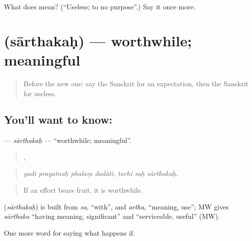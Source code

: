 \begin{tcolorbox}[breakable,colback=teal!4,colframe=teal!35!black,title={Before you move on}]
What does  mean? (\textquotedblleft{}Useless; to no purpose\textquotedblright{}.) Say it once more.
\end{tcolorbox}
\section[\texorpdfstring{\sk{सार्थकः} (sārthakaḥ)}{सार्थकः (sārthakaḥ)}]{ (sārthakaḥ) — worthwhile; meaningful}

\label{lesson:SA-C390-sarthakah}



\begin{quote}
Before the new one: say the Sanskrit for an expectation, then the Sanskrit for useless.
\end{quote}

\subsection*{You'll want to know: }
\textbf{} — \emph{sārthakaḥ} — \textquotedblleft{}worthwhile; meaningful\textquotedblright{}.

\begin{quote}
   ,   
\end{quote}

\begin{quote}
\emph{yadi prayatnaḥ phalaṃ dadāti, tarhi saḥ sārthakaḥ.}
\end{quote}

\begin{quote}
If an effort bears fruit, it is worthwhile.
\end{quote}

\begin{cousinweb}
\textbf{} (\emph{sārthakaḥ}) is built from \emph{sa}, \textquotedblleft{}with\textquotedblright{}, and \emph{artha}, \textquotedblleft{}meaning, use\textquotedblright{}; MW gives \emph{sārthaka} \textquotedblleft{}having meaning, significant\textquotedblright{} and \textquotedblleft{}serviceable, useful\textquotedblright{} (MW).
\end{cousinweb}

\begin{grammarlens}[title={What you've built}]
One more word for saying what happens if.
\end{grammarlens}

